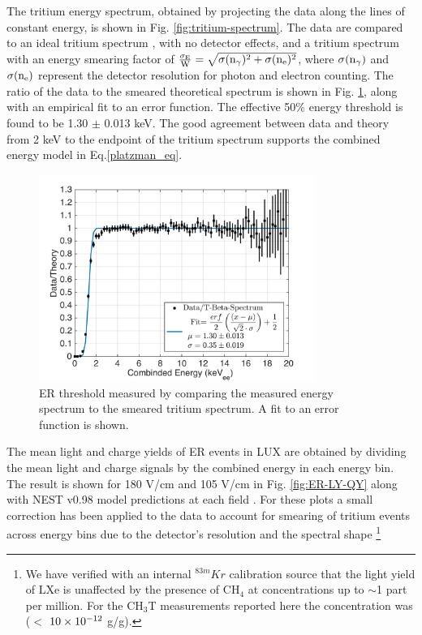 The tritium energy spectrum, obtained by projecting the data along the lines of constant energy, is shown in Fig. \ref{fig:tritium-spectrum}. The data are compared to an ideal tritium spectrum \cite{Tritium_Eq_Simpson}, with no detector effects, and a tritium spectrum with an energy smearing factor of $\rm \frac{\sigma_E}{W} = \sqrt{\sigma(n_{\gamma})^2 + \sigma(n_e)^2}$, where $\rm \sigma(n_{\gamma})$ and $\rm \sigma(n_e)$ represent the detector resolution for photon and electron counting. The ratio of the data to the smeared theoretical spectrum is shown in Fig. \ref{fig:ER-threshold}, along with an empirical fit to an error function. The effective 50\% energy threshold is found to be 1.30 $\pm$ 0.013 keV. The good agreement between data and theory from 2 keV to the endpoint of the tritium spectrum supports the combined energy model in Eq.\ref{platzman_eq}.

\begin{figure}[h!]\centering
\includegraphics[width=90mm]{fig/E_Thres_Fit.png}
\caption{ER threshold measured by comparing the measured energy spectrum to the smeared tritium spectrum. A fit to an error function is shown.}
\label{fig:ER-threshold}
\end{figure}




The mean light and charge yields of ER events in LUX are obtained by dividing the mean light and charge signals by the combined energy in each energy bin. The result is shown for 180 V/cm and 105 V/cm in Fig. \ref{fig:ER-LY-QY} along with NEST v0.98 model predictions at each field \cite{NEST_2013}. For these plots a small correction has been applied to the data to account for smearing of tritium events across energy bins due to the detector's resolution and the spectral shape \cite{Dobi_Thesis}\footnote{We have verified with an internal $^{83m}Kr$ calibration source that the light yield of LXe is unaffected by the presence of CH$_4$ at concentrations up to $\sim$1 part per million. For the CH$_3$T measurements reported here the concentration was ($<$ $\rm10\times10^{-12}$ g/g). }

